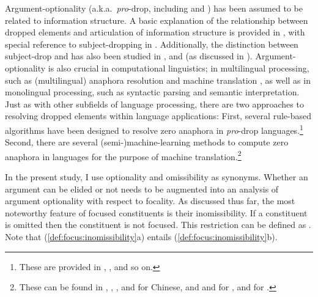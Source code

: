 Argument-optionality (a.k.a.\ \textit{pro}-drop, including
 and ) has been assumed to be related to
information structure.
A basic explanation of the relationship between
dropped elements and articulation of information structure is provided
in \citet{alonso:etal:02}, with special reference to subject-dropping
in . Additionally, the distinction between subject-drop
and  has also been studied in \citet{li:thompson:76},
\citet{huang:84} and \citet{yang:02} (as discussed in 
 ).
Argument-optionality is also crucial in computational linguistics; in
multilingual processing, such as (multilingual) anaphora resolution
and machine translation \citep{mitkov:etal:95,mitkov:99}, as well as
in monolingual processing, such as syntactic parsing and semantic
interpretation. Just as with other subfields of language processing,
there are two approaches to resolving dropped elements within language
applications: First, several rule-based algorithms have been designed
to resolve zero anaphora in \textit{pro}-drop
languages.\footnote{These are provided in \citet{han:06},
  \citet{byron:etal:06}, and so on.} Second, there are several
(semi-)machine-learning methods to compute zero anaphora in 
languages for the purpose of machine translation.\footnote{These can
  be found in \citet{zhao:ng:07}, \citet{yeh:chen:04},
  \citet{kong:ng:13}, and \citet{chen:ng:13} for Chinese,
  \citet{nakaiwa:shirai:96} and \citet{matsui:99} and
  \citet{hangyo:etal:13} for , and \citet{roh:lee:03}
  for .}


In the present study, I use optionality and omissibility as
synonyms. Whether an argument can be elided or not needs to be
augmented into an analysis of argument optionality with respect to
focality. As discussed thus far, the most
noteworthy feature of focused constituents is their inomissibility. If
a constituent is omitted then the constituent is not focused. This
restriction can be defined as .  Note
that (\ref{def:focus:inomissibility}a) entails
(\ref{def:focus:inomissibility}b).




